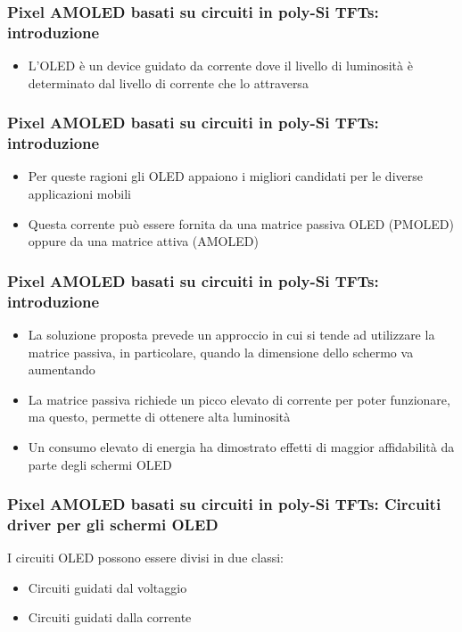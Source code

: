\documentclass[12pt]{beamer}
\begin{document}
	\begin{frame}
		\frametitle{Pixel AMOLED basati su circuiti in poly-Si TFTs: introduzione}
		\begin{itemize}
			\item L’OLED è un device guidato da corrente dove il livello di luminosità è determinato dal livello di corrente che lo attraversa
		\end{itemize}
	\end{frame}
	\begin{frame}
		\frametitle{Pixel AMOLED basati su circuiti in poly-Si TFTs: introduzione}
		\begin{itemize}
			\item Per queste ragioni gli OLED appaiono i migliori candidati per le diverse applicazioni mobili
			\pause
			\item Questa corrente può essere fornita da una matrice passiva OLED (PMOLED) oppure da una matrice attiva (AMOLED)
		\end{itemize}
	\end{frame}
	\begin{frame}
		\frametitle{Pixel AMOLED basati su circuiti in poly-Si TFTs: introduzione}
		\begin{itemize}
			\item La soluzione proposta prevede un approccio in cui si tende ad utilizzare la matrice passiva, in particolare, quando la dimensione dello schermo va aumentando
			\pause
			\item La matrice passiva richiede un picco elevato di corrente per poter funzionare, ma questo, permette di ottenere alta luminosità
			\pause
			\item Un consumo elevato di energia ha dimostrato effetti di maggior affidabilità da parte degli schermi OLED
		\end{itemize}
	\end{frame}
	\begin{frame}
		\frametitle{Pixel AMOLED basati su circuiti in poly-Si TFTs: Circuiti driver per gli schermi OLED}
		I circuiti OLED possono essere divisi in due classi:
		\begin{itemize}
			\item Circuiti guidati dal voltaggio
			\pause
			\item Circuiti guidati dalla corrente
		\end{itemize}
	\end{frame}
\end{document}
